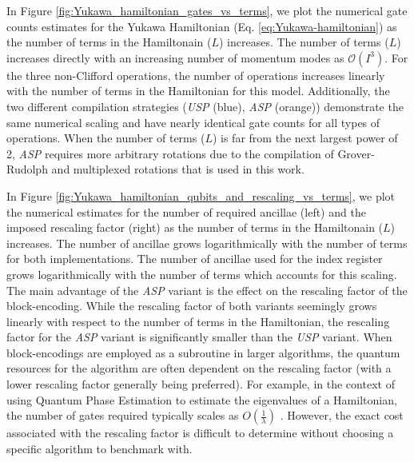 In Figure \ref{fig:Yukawa_hamiltonian_gates_vs_terms}, we plot the numerical gate counts estimates for the Yukawa Hamiltonian (Eq. \ref{eq:Yukawa-hamiltonian}) as the number of terms in the Hamiltonain ($L$) increases.
The number of terms ($L$) increases directly with an increasing number of momentum modes as $\mathcal{O}(I^3)$.
For the three non-Clifford operations, the number of operations increases linearly with the number of terms in the Hamiltonian for this model.
Additionally, the two different compilation strategies (\textit{USP} (blue), \textit{ASP} (orange)) demonstrate the same numerical scaling and have nearly identical gate counts for all types of operations.
When the number of terms ($L$) is far from the next largest power of 2, \textit{ASP} requires more arbitrary rotations due to the compilation of Grover-Rudolph and multiplexed rotations that is used in this work.

In Figure \ref{fig:Yukawa_hamiltonian_qubits_and_rescaling_vs_terms}, we plot the numerical estimates for the number of required ancillae (left) and the imposed rescaling factor (right) as the number of terms in the Hamiltonain ($L$) increases.
The number of ancillae grows logarithmically with the number of terms for both implementations.
The number of ancillae used for the index register grows logarithmically with the number of terms which accounts for this scaling.
The main advantage of the \textit{ASP} variant is the effect on the rescaling factor of the block-encoding.
While the rescaling factor of both variants seemingly grows linearly with respect to the number of terms in the Hamiltonian, the rescaling factor for the \textit{ASP} variant is significantly smaller than the \textit{USP} variant.
When block-encodings are employed as a subroutine in larger algorithms, the quantum resources for the algorithm are often dependent on the rescaling factor (with a lower rescaling factor generally being preferred).
For example, in the context of using Quantum Phase Estimation to estimate the eigenvalues of a Hamiltonian, the number of gates required typically scales as $O(\frac{1}{\lambda})$ \cite{babbush2018encoding}. 
However, the exact cost associated with the rescaling factor is difficult to determine without choosing a specific algorithm to benchmark with.

